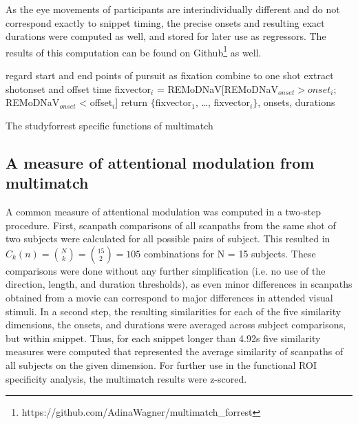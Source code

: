 \documentclass[a4paper, 12pt]{scrreprt}
\begin{document}
As the eye movements of participants are interindividually different and do not correspond exactly to snippet timing, the precise onsets and resulting exact durations were computed as well, and stored for later use as regressors. The results of this computation can be found on Github\footnote{https://github.com/AdinaWagner/multimatch\_forrest} as well.\newline
\medskip

\begin{algorithm}[H]
	\begin{small}
		
		{
			{
				regard start and end points of pursuit as fixation
			}
		}
		{
		}
		{
			{combine to one shot}
		}
		{
			{extract shotonset and offset time}
		}
		{fixvector$_i$ = REMoDNaV[REMoDNaV$_{onset} > onset_i$; REMoDNaV$_{onset}$ < offset$_i$]
		}
		return $\{$fixvector$_1$, \ldots, fixvector$_i$$\}$, onsets, durations
		\caption{The studyforrest specific functions of multimatch}
		\label{algo:multimatch_forrest}
	\end{small}
\end{algorithm}

\subsection{A measure of attentional modulation from multimatch}\label{section:multimatch_attention}
A common measure of attentional modulation was computed in a two-step procedure. First, scanpath comparisons of all scanpaths from the same shot of two subjects were calculated for all possible pairs of subject. This resulted in $C_k(n) = {N\choose k} = {15\choose 2} = 105$ combinations for N = 15 subjects. These comparisons were done without any further simplification (i.e. no use of the direction, length, and duration thresholds), as even minor differences in scanpaths obtained from a movie can correspond to major differences in attended visual stimuli. In a second step, the resulting similarities for each of the five similarity dimensions, the onsets, and durations were averaged across subject comparisons, but within snippet. Thus, for each snippet longer than 4.92s five similarity measures were computed that represented the average similarity of scanpaths of all subjects on the given dimension. For further use in the functional ROI specificity analysis, the multimatch results were z-scored.
 
\end{document}
